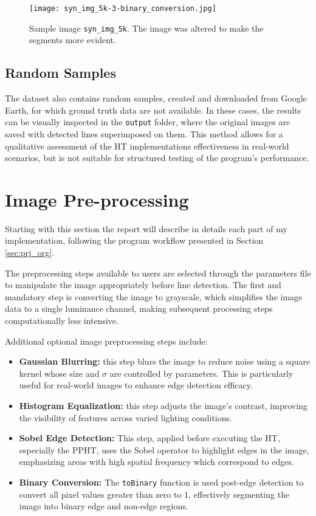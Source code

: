 \documentclass[conference]{IEEEtran}
\begin{document}
        \begin{figure}[htbp]
            \centering
            \texttt{[image: syn\_img\_5k-3-binary\_conversion.jpg]}
            \caption{Sample image \texttt{syn\_img\_5k}. The image was altered to make the segments more evident.}
            \label{fig:5k}
        \end{figure}
        
    \subsection{Random Samples}
    \label{subsec:random_samples}
    
        The dataset also contains random samples, created and downloaded from Google Earth, for which ground truth data are not available. In these cases, the results can be visually inspected in the \texttt{output} folder, where the original images are saved with detected lines superimposed on them. This method allows for a qualitative assessment of the HT implementations effectiveness in real-world scenarios, but is not suitable for structured testing of the program's performance.
    
\section{Image Pre-processing}
\label{sec:image_preprocessing}

    Starting with this section the report will describe in details each part of my implementation, following the program workflow presented in Section \ref{sec:prj_org}.
    
    The preprocessing steps available to users are selected through the parameters file to manipulate the image appropriately before line detection. The first and mandatory step is converting the image to grayscale, which simplifies the image data to a single luminance channel, making subsequent processing steps computationally less intensive.
    
    Additional optional image preprocessing steps include:
    \begin{itemize}
        \item \textbf{Gaussian Blurring:} this step blurs the image to reduce noise using a square kernel whose size and $\sigma$ are controlled by parameters. This is particularly useful for real-world images to enhance edge detection efficacy.
        \item \textbf{Histogram Equalization:} this step adjusts the image's contrast, improving the visibility of features across varied lighting conditions.
        \item \textbf{Sobel Edge Detection:} This step, applied before executing the HT, especially the PPHT, uses the Sobel operator to highlight edges in the image, emphasizing areas with high spatial frequency which correspond to edges.
        \item \textbf{Binary Conversion:} The \texttt{toBinary} function is used post-edge detection to convert all pixel values greater than zero to 1, effectively segmenting the image into binary edge and non-edge regions.
    \end{itemize}
    
\end{document}
